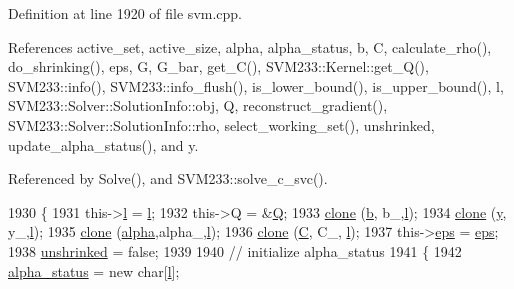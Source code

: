 Definition at line 1920 of file svm.\+cpp.



References active\+\_\+set, active\+\_\+size, alpha, alpha\+\_\+status, b, C, calculate\+\_\+rho(), do\+\_\+shrinking(), eps, G, G\+\_\+bar, get\+\_\+\+C(), S\+V\+M233\+::\+Kernel\+::get\+\_\+\+Q(), S\+V\+M233\+::info(), S\+V\+M233\+::info\+\_\+flush(), is\+\_\+lower\+\_\+bound(), is\+\_\+upper\+\_\+bound(), l, S\+V\+M233\+::\+Solver\+::\+Solution\+Info\+::obj, Q, reconstruct\+\_\+gradient(), S\+V\+M233\+::\+Solver\+::\+Solution\+Info\+::rho, select\+\_\+working\+\_\+set(), unshrinked, update\+\_\+alpha\+\_\+status(), and y.



Referenced by Solve(), and S\+V\+M233\+::solve\+\_\+c\+\_\+svc().


\begin{DoxyCode}
1930 \{
1931   this->\hyperlink{class_s_v_m233_1_1_solver_a258ab441755a415c6b1f0b19f55f36fc}{l} = \hyperlink{class_s_v_m233_1_1_solver_a258ab441755a415c6b1f0b19f55f36fc}{l};
1932   this->Q = &\hyperlink{class_s_v_m233_1_1_solver_a09e21006f46841e5c9c6f97b87995743}{Q};
1933   \hyperlink{namespace_s_v_m233_a042890ae5011103ccc6062a677cff472}{clone} (\hyperlink{class_s_v_m233_1_1_solver_ae7665148726947abe81ad6e54fdfca14}{b}, b\_,\hyperlink{class_s_v_m233_1_1_solver_a258ab441755a415c6b1f0b19f55f36fc}{l});
1934   \hyperlink{namespace_s_v_m233_a042890ae5011103ccc6062a677cff472}{clone} (\hyperlink{class_s_v_m233_1_1_solver_a17e4f05ccc46afc5b9bf686eac10928d}{y}, y\_,\hyperlink{class_s_v_m233_1_1_solver_a258ab441755a415c6b1f0b19f55f36fc}{l});
1935   \hyperlink{namespace_s_v_m233_a042890ae5011103ccc6062a677cff472}{clone} (\hyperlink{class_s_v_m233_1_1_solver_ade1450d3dbc0633ad00958cf2b78eb0b}{alpha},alpha\_,\hyperlink{class_s_v_m233_1_1_solver_a258ab441755a415c6b1f0b19f55f36fc}{l});
1936   \hyperlink{namespace_s_v_m233_a042890ae5011103ccc6062a677cff472}{clone} (\hyperlink{class_s_v_m233_1_1_solver_ab02bb338fce4d113399e8cfc66588dac}{C}, C\_, \hyperlink{class_s_v_m233_1_1_solver_a258ab441755a415c6b1f0b19f55f36fc}{l});
1937   this->\hyperlink{class_s_v_m233_1_1_solver_a5332bb5b52696238e1a9e784e187a901}{eps} = \hyperlink{class_s_v_m233_1_1_solver_a5332bb5b52696238e1a9e784e187a901}{eps};
1938   \hyperlink{class_s_v_m233_1_1_solver_a5cf7673b38cdd6d71056e904ec1cb6b9}{unshrinked} = \textcolor{keyword}{false};
1939 
1940   \textcolor{comment}{// initialize alpha\_status}
1941   \{
1942     \hyperlink{class_s_v_m233_1_1_solver_a53fe33a3d4e7904b9b26343eb3942309}{alpha\_status} = \textcolor{keyword}{new} \textcolor{keywordtype}{char}[\hyperlink{class_s_v_m233_1_1_solver_a258ab441755a415c6b1f0b19f55f36fc}{l}];

\end{DoxyCode}
